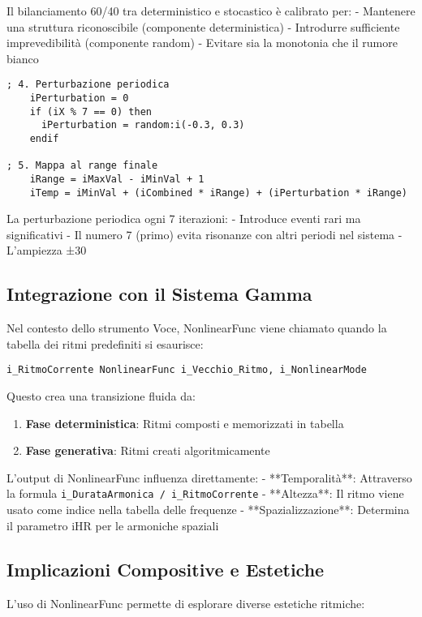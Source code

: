 Il bilanciamento 60/40 tra deterministico e stocastico è calibrato per:
- Mantenere una struttura riconoscibile (componente deterministica)
- Introdurre sufficiente imprevedibilità (componente random)
- Evitare sia la monotonia che il rumore bianco

\begin{lstlisting}[language=Csound]
    ; 4. Perturbazione periodica
    iPerturbation = 0
    if (iX % 7 == 0) then 
      iPerturbation = random:i(-0.3, 0.3)
    endif

; 5. Mappa al range finale
    iRange = iMaxVal - iMinVal + 1
    iTemp = iMinVal + (iCombined * iRange) + (iPerturbation * iRange)
\end{lstlisting}

La perturbazione periodica ogni 7 iterazioni:
- Introduce eventi rari ma significativi
- Il numero 7 (primo) evita risonanze con altri periodi nel sistema
- L'ampiezza ±30%
\subsection{Integrazione con il Sistema Gamma}
Nel contesto dello strumento Voce, NonlinearFunc viene chiamato quando la tabella dei ritmi predefiniti si esaurisce:

\begin{lstlisting}[language=Csound]
i_RitmoCorrente NonlinearFunc i_Vecchio_Ritmo, i_NonlinearMode
\end{lstlisting}

Questo crea una transizione fluida da:
\begin{enumerate}
    \item \textbf{Fase deterministica}: Ritmi composti e memorizzati in tabella
    \item \textbf{Fase generativa}: Ritmi creati algoritmicamente
\end{enumerate}

L'output di NonlinearFunc influenza direttamente:
- **Temporalità**: Attraverso la formula \texttt{i\_DurataArmonica / i\_RitmoCorrente}
- **Altezza**: Il ritmo viene usato come indice nella tabella delle frequenze
- **Spazializzazione**: Determina il parametro iHR per le armoniche spaziali
\subsection{Implicazioni Compositive e Estetiche}
L'uso di NonlinearFunc permette di esplorare diverse estetiche ritmiche:

